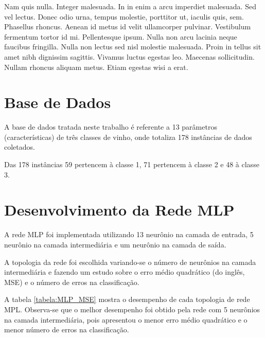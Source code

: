 Nam quis nulla. Integer malesuada. In in enim a arcu imperdiet malesuada. Sed vel lectus. Donec odio urna, tempus molestie, porttitor ut, iaculis quis, sem. Phasellus rhoncus. Aenean id metus id velit ullamcorper pulvinar. Vestibulum fermentum tortor id mi. Pellentesque ipsum. Nulla non arcu lacinia neque faucibus fringilla. Nulla non lectus sed nisl molestie malesuada. Proin in tellus sit amet nibh dignissim sagittis. Vivamus luctus egestas leo. Maecenas sollicitudin. Nullam rhoncus aliquam metus. Etiam egestas wisi a erat.



\section{Base de Dados} \label{baseDados}

A base de dados tratada neste trabalho é referente a 13 parâmetros (características) de três classes de vinho, onde totaliza 178 instâncias de dados coletados.

Das 178 instâncias 59 pertencem à classe 1, 71 pertencem à classe 2 e 48 à classe 3.





\section{Desenvolvimento da Rede MLP} \label{desenvolvimentoMLP}

A rede MLP foi implementada utilizando 13 neurônio na camada de entrada, 5 neurônio na camada intermediária e um neurônio na camada de saída.

A topologia da rede foi escolhida variando-se o número de neurônios na camada intermediária e fazendo um estudo sobre o erro médio quadrático (do inglês, MSE) e o número de erros na classificação.


A tabela \ref{tabela:MLP_MSE} mostra o desempenho de cada topologia de rede MPL. Observa-se que o melhor desempenho foi obtido pela rede com 5 neurônios na camada intermediária, pois apresentou o menor erro médio quadrático e o menor número de erros na classificação.



